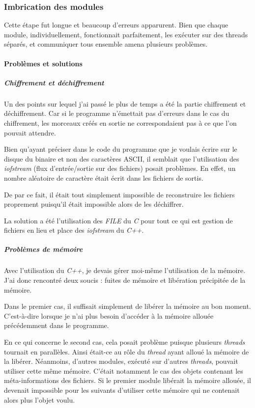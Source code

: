 \documentclass[a4paper,10pt, twoside]{report}
\begin{document}
\begin{spacing}{1.2}
\subsubsection{Imbrication des modules}
Cette \'etape fut longue et beaucoup d'erreurs apparurent. Bien que chaque
module, individuellement, fonctionnait parfaitement, les ex\'ecuter sur des
threads s\'epar\'es, et communiquer tous ensemble amena plusieurs probl\`emes.

\paragraph{Probl\`emes et solutions}

\subparagraph{Chiffrement et d\'echiffrement\\}
Un des points sur lequel j'ai pass\'e le plus de temps a \'et\'e la partie
chiffrement et d\'echiffrement. Car si le programme n'\'emettait pas d'erreurs
dans le cas du chiffrement, les morceaux cr\'e\'es en sortie ne correspondaient
pas \`a ce que l'on pouvait attendre.

Bien qu'ayant pr\'eciser dans le code du programme que je voulais \'ecrire
sur le disque du binaire et non des caract\`eres ASCII, il semblait que
l'utilisation des \textit{iofstream} (flux d'entr\'ee/sortie sur des fichiers)
posait probl\`emes. En effet, un nombre al\'eatoire de caract\`ere \'etait
\'ecrit dans les fichiers de sortis. 

De par ce fait, il \'etait tout simplement impossible de reconstruire les
fichiers proprement puisqu'il \'etait impossible alors de les d\'echiffrer.

La solution a \'et\'e l'utilisation des \textit{FILE} du \textit{C} pour tout
ce qui est gestion de fichiers en lieu et place des \textit{iofstream} du
\textit{C++}.

\subparagraph{Probl\`emes de m\'emoire\\}
Avec l'utilisation du \textit{C++}, je devais g\'erer moi-m\^eme l'utilisation
de la m\'emoire. J'ai donc rencontr\'e deux soucis : fuites de m\'emoire et
lib\'eration pr\'ecipit\'ee de la m\'emoire.

Dans le premier cas, il suffisait simplement de lib\'erer la m\'emoire au bon
moment. C'est-\`a-dire lorsque je n'ai plus besoin d'acc\'eder \`a la m\'emoire
allou\'ee pr\'ec\'edemment dans le programme.

En ce qui concerne le second cas, cela posait probl\`eme puisque plusieurs
\textit{threads} tournait en parall\`eles. Ainsi \'etait-ce au r\^ole du
\textit{thread} ayant allou\'e la m\'emoire de la lib\'erer. N\'eanmoins,
d'autres modules, ex\'ecut\'e sur d'autres \textit{threads}, pouvait utiliser
cette m\^eme m\'emoire. C'\'etait notamment le cas des objets contenant les
m\'eta-informations des fichiers. Si le premier module lib\'erait la m\'emoire
allou\'ee, il devenait impossible pour les suivants d'utiliser cette m\'emoire
qui ne contenait alors plus l'objet voulu.


\end{spacing}
\end{document}
